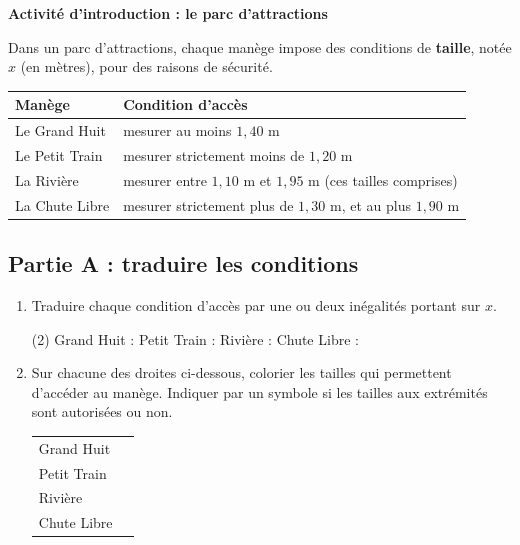 \documentclass{article}
\newcommand{\droitetailles}{%
  \begin{tikzpicture}[x=11cm]
    \draw[-{Latex[length=2mm]}] (0.85,0) -- (2.15,0) node[right] {\small $x$ (m)};
    \foreach \x/\l in {0.9/0{,}9, 1.0/1{,}0, 1.1/1{,}1, 1.2/1{,}2, 1.3/1{,}3, 1.4/1{,}4, 1.5/1{,}5, 1.6/1{,}6, 1.7/1{,}7, 1.8/1{,}8, 1.9/1{,}9, 2.0/2{,}0, 2.1/2{,}1} {
      \draw (\x,0.1) -- (\x,-0.1);
      \node[below] at (\x,-0.1) {\scriptsize$\l$};
    }
    \foreach \x in {0.95,1.05,...,2.05} \draw (\x,0.05) -- (\x,-0.05);
  \end{tikzpicture}%
}
\begin{document}
\pagestyle{fancy}
\fancyhf{}
\fancyhead[L]{\textbf{\Niveau}}
\fancyhead[C]{\textbf{\ChapitreCourt}}
\fancyhead[R]{\textbf{\Document}}

\large

\begin{center}
  {\Large\bfseries Activité d'introduction : le parc d'attractions}
\end{center}

Dans un parc d'attractions, chaque manège impose des conditions de \textbf{taille}, notée $x$ (en mètres), pour des raisons de sécurité.

\begin{center}
  \renewcommand{\arraystretch}{1.5}
  \begin{tabular}{|C{3.2cm}|C{11cm}|}
    \hline
    \textbf{Manège} & \textbf{Condition d'accès} \\ \hline
    Le Grand Huit & mesurer au moins $1{,}40$ m \\ \hline
    Le Petit Train & mesurer strictement moins de $1{,}20$ m \\ \hline
    La Rivière & mesurer entre $1{,}10$ m et $1{,}95$ m (ces tailles comprises) \\ \hline
    La Chute Libre & mesurer strictement plus de $1{,}30$ m, et au plus $1{,}90$ m \\ \hline
  \end{tabular}
\end{center}

\subsection*{Partie A : traduire les conditions}

\begin{enumerate}
  \item Traduire chaque condition d'accès par une ou deux inégalités portant sur $x$.

  \smallskip
  \begin{tasks}(2)
    \task Grand Huit : \dotfill
    \task Petit Train : \dotfill
    \task Rivière : \dotfill
    \task Chute Libre : \dotfill
  \end{tasks}

  \item Sur chacune des droites ci-dessous, colorier les tailles qui permettent d'accéder au manège. Indiquer par un symbole si les tailles aux extrémités sont autorisées ou non.

  \medskip
  \begin{tabular}{@{}p{2.3cm}l@{}}
    Grand Huit & \droitetailles \\[1.2em]
    Petit Train & \droitetailles \\[1.2em]
    Rivière & \droitetailles \\[1.2em]
    Chute Libre & \droitetailles
  \end{tabular}
\end{enumerate}
\end{document}
